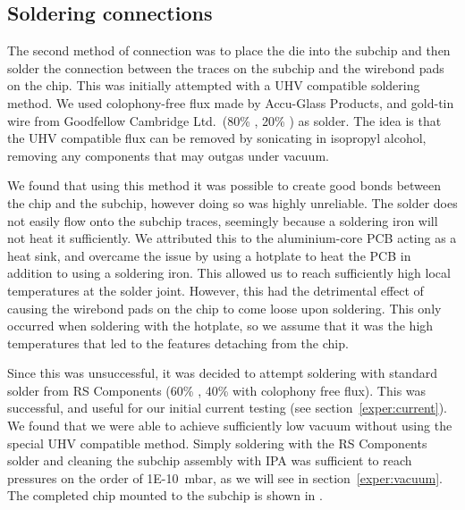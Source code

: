 \subsection{Soldering connections}
\label{fab:solder}

The second method of connection was to place the die into the subchip and then
solder the connection between the traces on the subchip and the wirebond pads
on the chip. This was initially attempted with a UHV compatible soldering
method. We used  colophony-free flux made by Accu-Glass
Products, and gold-tin wire from Goodfellow Cambridge Ltd.\ (80\% \Au{}, 20\%
\Sn{}) as solder. The idea is that the UHV compatible flux can be removed by
sonicating in isopropyl alcohol, removing any components that may outgas under
vacuum.

We found that using this method it was possible to create good bonds between
the chip and the subchip, however doing so was highly unreliable. The solder
does not easily flow onto the subchip traces, seemingly because a soldering
iron will not heat it sufficiently. We attributed this to the aluminium-core
PCB acting as a heat sink, and overcame the issue by using a hotplate to heat
the PCB in addition to using a soldering iron. This allowed us to reach
sufficiently high  local temperatures at the solder joint.
%
However, this had the detrimental effect of causing the wirebond pads on the
chip to come loose upon soldering. This only occurred when soldering with the
hotplate, so we assume that it was the high temperatures that led to the
features detaching from the chip.

Since this was unsuccessful, it was decided to attempt soldering with standard
solder from RS Components (60\% \Pb{}, 40\% \Sn{} with colophony free flux).
This was successful, and useful for our initial current testing (see
section~\ref{exper:current}). We found that we were able to achieve
sufficiently low vacuum without using the special UHV compatible method. Simply
soldering with the RS Components solder and cleaning the subchip assembly with
IPA was sufficient to reach pressures on the order of \SI{1E-10}{\milli\bar},
as we will see in section~\ref{exper:vacuum}. The completed chip mounted to the
subchip is shown in .

